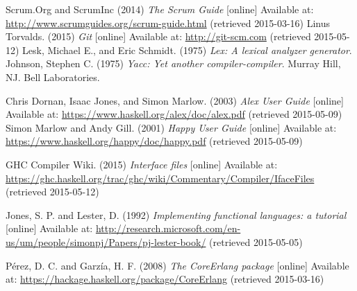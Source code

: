\begin{thebibliography}{69}
 Scrum.Org and ScrumInc (2014) \textit{The Scrum Guide} [online] Available at: \url{http://www.scrumguides.org/scrum-guide.html} (retrieved 2015-03-16)
  Linus Torvalds. (2015) \textit{Git} [online] Available at: \url{http://git-scm.com} (retrieved 2015-05-12)
 Lesk, Michael E., and Eric Schmidt. (1975) \textit{Lex: A lexical analyzer generator}.
 Johnson, Stephen C. (1975) \textit{Yacc: Yet another compiler-compiler}. Murray Hill, NJ. Bell Laboratories.

 Chris Dornan, Isaac Jones, and Simon Marlow. (2003) \textit{Alex User Guide} [online] Available at: \url{https://www.haskell.org/alex/doc/alex.pdf} (retrieved 2015-05-09)
 Simon Marlow and Andy Gill. (2001) \textit{Happy User Guide} [online] Available at: \url{https://www.haskell.org/happy/doc/happy.pdf} (retrieved 2015-05-09)


  GHC Compiler Wiki. (2015) \textit{Interface files} [online] Available at: \url{https://ghc.haskell.org/trac/ghc/wiki/Commentary/Compiler/IfaceFiles} (retrieved 2015-05-12)

 Jones, S. P. and Lester, D. (1992) \textit{Implementing functional languages: a tutorial} [online] Available at: \url{http://research.microsoft.com/en-us/um/people/simonpj/Papers/pj-lester-book/} (retrieved 2015-05-05)


 Pérez, D. C. and Garzía, H. F. (2008) \textit{The CoreErlang package} [online] Available at: \url{https://hackage.haskell.org/package/CoreErlang} (retrieved 2015-03-16)

\end{thebibliography}
